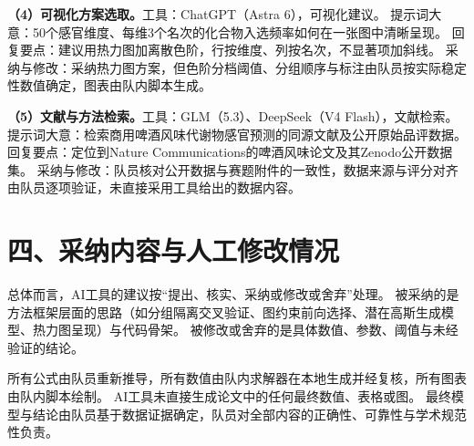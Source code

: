 \documentclass[11pt,a4paper]{article}
\begin{document}
\textbf{（4）可视化方案选取。}工具：ChatGPT（Astra 6），可视化建议。
提示词大意：50个感官维度、每维3个名次的化合物入选频率如何在一张图中清晰呈现。
回复要点：建议用热力图加离散色阶，行按维度、列按名次，不显著项加斜线。
采纳与修改：采纳热力图方案，但色阶分档阈值、分组顺序与标注由队员按实际稳定性数值确定，图表由队内脚本生成。

\textbf{（5）文献与方法检索。}工具：GLM（5.3）、DeepSeek（V4 Flash），文献检索。
提示词大意：检索商用啤酒风味代谢物感官预测的同源文献及公开原始品评数据。
回复要点：定位到Nature Communications的啤酒风味论文及其Zenodo公开数据集。
采纳与修改：队员核对公开数据与赛题附件的一致性，数据来源与评分对齐由队员逐项验证，未直接采用工具给出的数据内容。

\section*{四、采纳内容与人工修改情况}

总体而言，AI工具的建议按“提出、核实、采纳或修改或舍弃”处理。
被采纳的是方法框架层面的思路（如分组隔离交叉验证、图约束前向选择、潜在高斯生成模型、热力图呈现）与代码骨架。
被修改或舍弃的是具体数值、参数、阈值与未经验证的结论。

所有公式由队员重新推导，所有数值由队内求解器在本地生成并经复核，所有图表由队内脚本绘制。
AI工具未直接生成论文中的任何最终数值、表格或图。
最终模型与结论由队员基于数据证据确定，队员对全部内容的正确性、可靠性与学术规范性负责。
\end{document}
